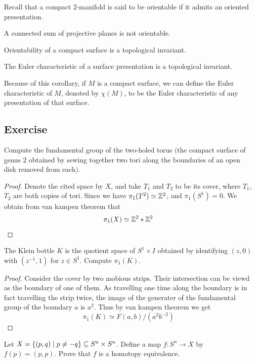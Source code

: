 Recall that a compact $2$-manifold is said to be orientable if it admits an oriented presentation.
\begin{corollary}
A connected sum of projective planes is not orientable.
\end{corollary}
\begin{corollary}
Orientability of a compact surface is a topological invariant.
\end{corollary}
\begin{corollary}
The Euler characteristic of a surface presentation is a topological invariant.
\end{corollary}
Because of this corollary, if $M$ is a compact surface, we can define the Euler
characteristic of $M$, denoted by $\chi(M)$, to be the Euler characteristic of any presentation of that surface.
\subsection{Exercise}
\begin{exercise}
Compute the fundamental group of the two-holed torus $($the compact surface of genus $2$ obtained by sewing together two tori along the boundaries of an open disk removed from each$)$.
\end{exercise}
\begin{proof}
Denote the cited space by $X$, and take $T_1$ and $T_2$ to be its cover, where $T_1$, $T_2$ are both copies of tori. Since we have $\pi_1(T^2)\simeq\mathbb{Z}^2$, and $\pi_1(S^1)=0$. We obtain from van kampen theorem that
\[\pi_1(X)\simeq\mathbb{Z}^2\ast\mathbb{Z}^2\]
\end{proof}
\begin{exercise}
The Klein bottle $K$ is the quotient space of $S^1\times I$ obtained by identifying $(z,0)$ with $(z^{-1},1)$ for $z\in S^1$. Compute $\pi_1(K)$.
\end{exercise}
\begin{proof}
Consider the cover by two mobious strips. Their intersection can be viewd as the boundary of one of them. As travelling one time along the boundary is in fact travelling the strip twice, the image of the generater of the fundamental group of the boundary $a$ is $a^2$. Thus by van kampen theorem we get
\[\pi_1(K)\simeq F(a,b)/(a^2b^{-2})\]
\end{proof}
\begin{exercise}
Let $X=\{(p,q)\mid p\neq-q\}\subseteq S^n\times S^n$. Define a map $f:S^n\to X$ by $f(p)=(p,p)$. Prove that $f$ is a homotopy equivalence.
\end{exercise}
